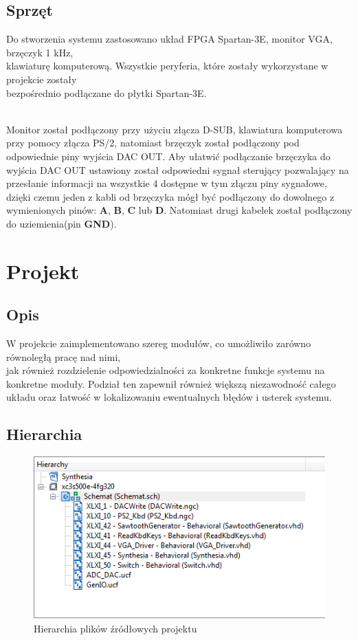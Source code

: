\documentclass[a4paper]{report}
\begin{document}
	\section{Sprzęt}
		\par Do stworzenia systemu zastosowano układ FPGA Spartan-3E, 
		monitor VGA, brzęczyk 1 kHz, \\klawiaturę komputerową. Wszystkie peryferia, które zostały wykorzystane w projekcie
		zostały \\bezpośrednio podłączane do płytki Spartan-3E.\\\\
		\par Monitor został podłączony przy użyciu złącza D-SUB, 
		klawiatura komputerowa przy pomocy złącza PS/2, natomiast brzęczyk został podłączony pod odpowiednie piny wyjścia DAC OUT. Aby ułatwić 
		podłączanie brzęczyka do wyjścia DAC OUT ustawiony został odpowiedni sygnał sterujący pozwalający na przesłanie informacji na wszystkie 4 dostępne w tym 
		złączu piny sygnałowe, dzięki czemu jeden z kabli od brzęczyka mógł być podłączony do dowolnego z wymienionych pinów: \textbf{A},
		\textbf{B}, \textbf{C} lub \textbf{D}. Natomiast drugi kabelek został podłączony do uziemienia(pin \textbf{GND}).

\chapter{Projekt}
	\section{Opis}
	W projekcie zaimplementowano szereg modułów, co umożliwiło zarówno równoległą pracę nad nimi, \\jak również rozdzielenie odpowiedzialności za konkretne funkcje systemu na konkretne moduły. 
	Podział ten zapewnił również większą niezawodność całego układu oraz łatwość w lokalizowaniu 			ewentualnych błędów i usterek systemu.
	\section{Hierarchia}
		\begin{figure}[h!]
			\centering
			\includegraphics{hierarchy.png}
			\caption{Hierarchia plików źródłowych projektu}
		\end{figure}
				
\end{document}
